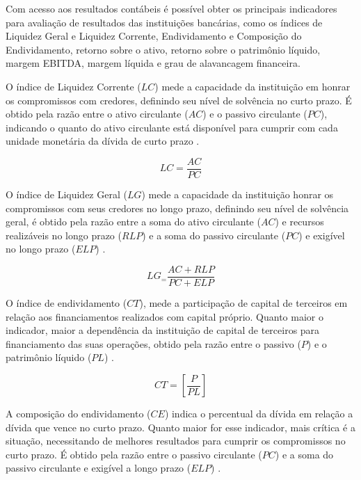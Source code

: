 \documentclass[
  12pt,
  12pt,
  openright,
  oneside,
  a4paper,
  chapter=TITLE,
  section=TITLE,
  subsection=TITLE,
  subsubsection=TITLE,
  english,
  portugues,
  sumario=tradicional]{abntex2}
\begin{document}
Com acesso aos resultados contábeis é possível obter os principais indicadores para avaliação de resultados das instituições bancárias, como os índices de Liquidez Geral e Liquidez Corrente, Endividamento e Composição do Endividamento, retorno sobre o ativo, retorno sobre o patrimônio líquido, margem EBITDA, margem líquida e grau de alavancagem financeira.

O índice de Liquidez Corrente (\(LC\)) mede a capacidade da instituição em honrar os compromissos com credores, definindo seu nível de solvência no curto prazo. É obtido pela razão entre o ativo circulante (\(AC\)) e o passivo circulante (\(PC\)), indicando o quanto do ativo circulante está disponível para cumprir com cada unidade monetária da dívida de curto prazo \cite{graham:2012} \cite{assaf:2020}.

\begin{equation}
LC = \frac{AC}{PC}
\end{equation}

O índice de Liquidez Geral (\(LG\)) mede a capacidade da instituição honrar os compromissos com seus credores no longo prazo, definindo seu nível de solvência geral, é obtido pela razão entre a soma do ativo circulante (\(AC\)) e recursos realizáveis no longo prazo (\(RLP\)) e a soma do passivo circulante (\(PC\)) e exigível no longo prazo (\(ELP\)) \cite{assaf:2020}.

\begin{equation}
LG_ = \frac{AC + RLP}{PC + ELP}
\end{equation}

O índice de endividamento (\(CT\)), mede a participação de capital de terceiros em relação aos financiamentos realizados com capital próprio. Quanto maior o indicador, maior a dependência da instituição de capital de terceiros para financiamento das suas operações, obtido pela razão entre o passivo (\(P\)) e o patrimônio líquido (\(PL\)) \cite{assaf:2020}.

\begin{equation}
CT = [\frac{P}{PL}]
\end{equation}

A composição do endividamento (\(CE\)) indica o percentual da dívida em relação a dívida que vence no curto prazo. Quanto maior for esse indicador, mais crítica é a situação, necessitando de melhores resultados para cumprir os compromissos no curto prazo. É obtido pela razão entre o passivo circulante (\(PC\)) e a soma do passivo circulante e exigível a longo prazo (\(ELP\)) \cite{assaf:2020}.
\end{document}
